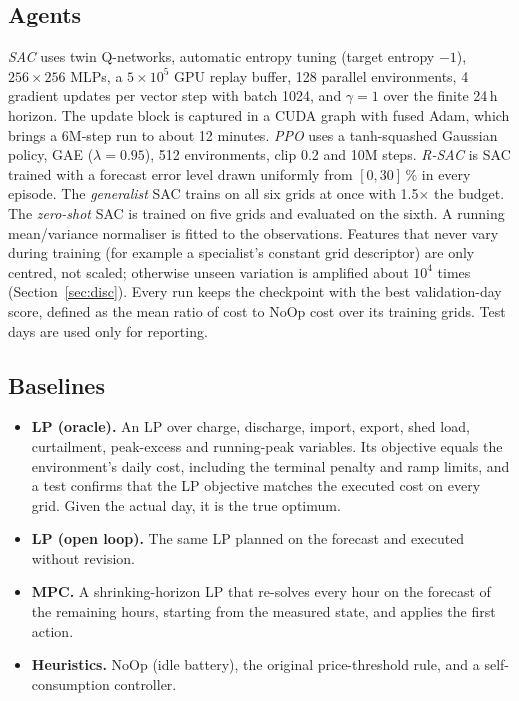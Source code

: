 \documentclass[conference]{IEEEtran}
\begin{document}
\subsection{Agents}
\textit{SAC} uses twin Q-networks, automatic entropy tuning (target entropy
$-1$), $256\times256$ MLPs, a $5\times10^5$ GPU replay buffer, 128 parallel
environments, 4 gradient updates per vector step with batch 1024, and
$\gamma=1$ over the finite 24\,h horizon. The update block is captured in a CUDA
graph with fused Adam, which brings a 6M-step run to about 12 minutes.
\textit{PPO} uses a tanh-squashed Gaussian policy, GAE ($\lambda=0.95$), 512
environments, clip 0.2 and 10M steps. \textit{R-SAC} is SAC trained with a forecast
error level drawn uniformly from $[0,30]$\,\% in every episode. The
\textit{generalist} SAC trains on all six grids at once with 1.5$\times$ the
budget. The \textit{zero-shot} SAC is trained on five grids and evaluated on the
sixth. A running mean/variance normaliser is fitted to the observations.
Features that never vary during training (for example a specialist's constant
grid descriptor) are only centred, not scaled; otherwise unseen variation is
amplified about $10^4$ times (Section~\ref{sec:disc}). Every run keeps the
checkpoint with the best validation-day score, defined as the mean ratio of
cost to NoOp cost over its training grids. Test days are used only for
reporting.

\subsection{Baselines}
\begin{itemize}
\item \textbf{LP (oracle).} An LP over charge, discharge, import, export, shed load, curtailment, peak-excess and running-peak variables. Its objective equals the environment's daily cost, including the terminal penalty and ramp limits, and a test confirms that the LP objective matches the executed cost on every grid. Given the actual day, it is the true optimum.
\item \textbf{LP (open loop).} The same LP planned on the forecast and executed without revision.
\item \textbf{MPC.} A shrinking-horizon LP that re-solves every hour on the forecast of the remaining hours, starting from the measured state, and applies the first action.
\item \textbf{Heuristics.} NoOp (idle battery), the original price-threshold rule, and a self-consumption controller.
\end{itemize}
\end{document}

